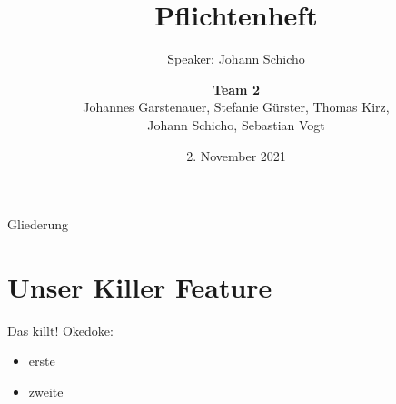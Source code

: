 \documentclass{beamer}
\title{Pflichtenheft}
\subtitle{Speaker: Johann Schicho}
\date{\small 2. November 2021}
\author{\textbf{Team 2} \\ \small {Johannes Garstenauer, Stefanie Gürster, Thomas Kirz,\\ Johann Schicho, Sebastian Vogt} \normalsize}
\begin{document}
	\begin{frame}
		\titlepage
	\end{frame}

	\begin{frame}{Gliederung}
		\tableofcontents
	\end{frame}

\section{Unser Killer Feature}
\begin{frame}{Das killt!}
	Okedoke:

	\begin{itemize}
		\item erste
		\item zweite
	\end{itemize}
\end{frame}
\end{document}
